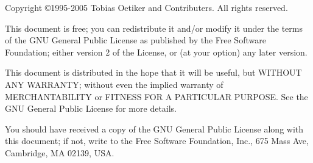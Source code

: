 
\ifpdf
\fi
\newlength{\centeroffset}
\setlength{\centeroffset}{-0.5\oddsidemargin}
\addtolength{\centeroffset}{0.5\evensidemargin}
\thispagestyle{empty}
\noindent\hspace*{\centeroffset}

\noindent\hspace*{\centeroffset}



\pagebreak
\begin{small} 
  Copyright \copyright 1995-2005 Tobias Oetiker and Contributers.  All rights reserved.
 
  This document is free; you can redistribute it and/or modify it
  under the terms of the GNU General Public License as published by
  the Free Software Foundation; either version 2 of the License, or
  (at your option) any later version.
  
  This document is distributed in the hope that it will be useful, but
  WITHOUT ANY WARRANTY; without even the implied warranty of
  MERCHANTABILITY or FITNESS FOR A PARTICULAR PURPOSE\@.  See the GNU
  General Public License for more details.
  
  You should have received a copy of the GNU General Public License
  along with this document; if not, write to the Free Software
  Foundation, Inc., 675 Mass Ave, Cambridge, MA 02139, USA.

\end{small}


\endinput

%

